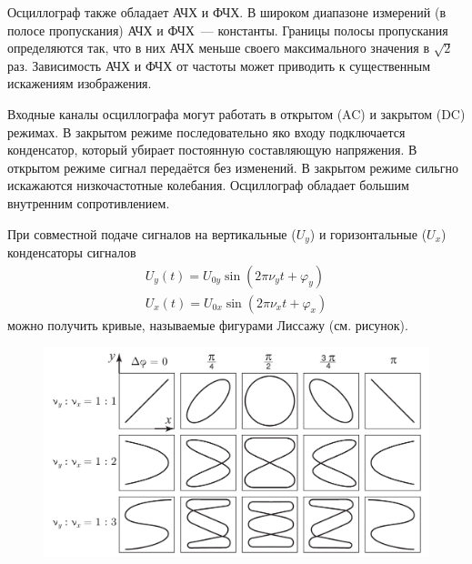 Осциллограф также обладает АЧХ и ФЧХ. В широком диапазоне измерений (в полосе пропускания)
АЧХ и ФЧХ~--- константы. Границы полосы пропускания определяются так, что в них АЧХ
меньше своего максимального значения в $\sqrt{2}$ раз. Зависимость АЧХ и ФЧХ от частоты
может приводить к существенным искажениям изображения.

Входные каналы осциллографа могут работать в открытом (AC) и закрытом (DC) режимах.
В закрытом режиме последовательно яко входу подключается конденсатор, который
убирает постоянную составляющую напряжения. В открытом режиме сигнал передаётся
без изменений. В закрытом режиме сильгно искажаются низкочастотные колебания.
Осциллограф обладает большим внутренним сопротивлением.

При совместной подаче сигналов на вертикальные ($U_y$) и горизонтальные ($U_x$)
конденсаторы сигналов
\begin{gather*}
    U_y(t) = U_{0y}\sin \left(2\pi\nu_yt + \varphi_y\right) \\
    U_x(t) = U_{0x}\sin \left(2\pi\nu_xt + \varphi_x\right)
\end{gather*}
можно получить кривые, называемые фигурами Лиссажу (см. рисунок).

\begin{figure}[ht!]
    \centering
    \includegraphics[width=0.8\linewidth]{img/picture4.png}
\end{figure}
